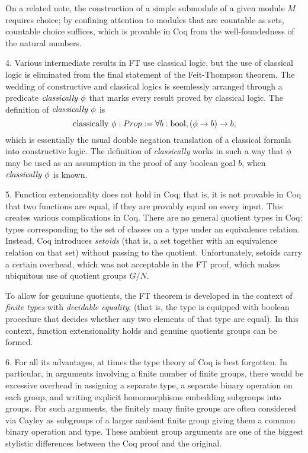 \documentclass[brochure,english,12pt]{bourbaki}
\theoremstyle{plain}
\def\op#1{{\operatorname{#1}}}
\begin{document}
On a related note, the construction of a simple submodule of a given module $M$ requires choice;
by confining attention to modules that are countable as sets, countable choice suffices, which 
is provable in Coq from the well-foundedness of the natural numbers.


4.  Various intermediate results in FT use classical logic, but the use of classical
logic is eliminated from the final statement of the Feit-Thompson theorem.  The wedding of constructive and
classical logics is 
seemlessly arranged
through a predicate $\op{\it classically}~\phi$ that marks every result proved by classical logic.
The definition of $\op{\it classically}~\phi$ is
\[
\op{classically}~\phi : Prop := \forall {b:\bool}, (\phi\to b) \to b,
\]
which is essentially the usual double negation translation of a classical formula into
constructive logic.  The definition of {\it classically} works in such a way that $\phi$ may
be used as an assumption in the proof of any boolean goal $b$, when $\op{\it classically}~\phi$ is known.

5.  Function extensionality does not hold in Coq; that is, it is not provable in Coq
that two functions are equal, if they are provably equal on every input.  This creates various
complications in Coq.  There are no general quotient types in Coq: types corresponding
to the set of classes on a type under an equivalence relation.  Instead, Coq introduces {\it setoids} 
(that is, a set together 
with an equivalence relation on that set) without passing to the quotient.  Unfortunately, setoids carry a certain
overhead, which was not acceptable in the FT proof, which makes ubiquitous use of quotient
groups $G/N$.   

To allow for genuiune quotients, the FT theorem is developed in the context of {\it finite types} with {\it decidable equality};
(that is, the type is equipped with boolean procedure that decides whether any two elements of that type are equal).
In this context, function extensionality holds and genuine quotients groups can be formed.


6.  For all its advantages, at times the type theory of Coq is best forgotten.  In particular,
in arguments involving a finite number of finite groups, there would be excessive overhead in
assigning a separate type, a separate binary operation on each group, 
and writing explicit homomorphisms embedding subgroups into groups.
 For such arguments, the finitely many finite groups are
often considered via Cayley as subgroups of a larger ambient finite group giving them a common binary
operation and type.  These ambient group arguments are one of the biggest stylistic differences
between the Coq proof and the original.
\end{document}
